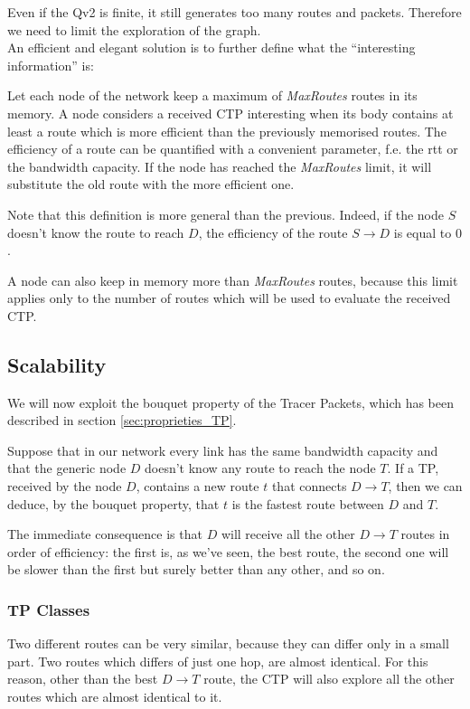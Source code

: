 \documentclass[a4paper]{article}
\begin{document}
Even if the Qv2 is finite, it still generates too many routes and packets.
Therefore we need to limit the exploration of the graph.\\
An efficient and elegant solution is to further define what the ``interesting
information'' is:

Let each node of the network keep a maximum of \emph{MaxRoutes} routes in
its memory. A node considers a received CTP interesting when its body contains
at least a route which is more efficient than the previously memorised routes.
The efficiency of a route can be quantified with a convenient parameter, f.e.
the rtt or the bandwidth capacity.
If the node has reached the \emph{MaxRoutes} limit, it will substitute the old
route with the more efficient one.

Note that this definition is more general than the previous. Indeed, if the
node $S$ doesn't know the route to reach $D$, the efficiency of the route $S
\rightarrow D$ is equal to $0$.

A node can also keep in memory more than \emph{MaxRoutes} routes, because this
limit applies only to the number of routes which will be used to evaluate the
received CTP.

\subsection{Scalability}
\label{sec:Scalability}
We will now exploit the bouquet property of the Tracer Packets, which has
been described in section \ref{sec:proprieties_TP}.

Suppose that in our network every link has the same bandwidth capacity and
that the generic node $D$ doesn't know any route to reach the
node $T$.
If a TP, received by the node $D$, contains a new route $t$ that
connects $D \rightarrow T$, then we can deduce, by the bouquet property, that
$t$ is the fastest route between $D$ and $T$.

The immediate consequence is that $D$ will receive all the other $D
\rightarrow T$ routes in order of efficiency: the first is, as we've seen,
the best route, the second one will be slower than the first but surely
better than any other, and so on.


\subsubsection{TP Classes}
\label{sec:tp_classes}
Two different routes can be very similar, because they can differ only in a
small part. Two routes which differs of just one hop, are almost identical.
For this reason, other than the best $D \rightarrow  T$ route, the CTP will
also explore all the other routes which are almost identical to it.
\end{document}
